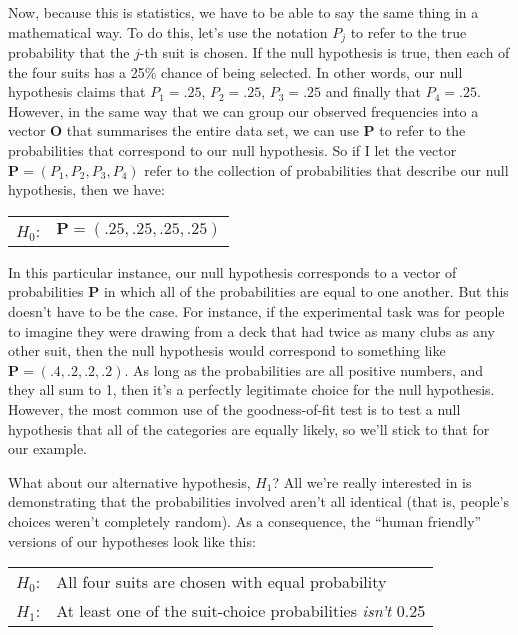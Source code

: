 \noindent
Now, because this is statistics, we have to be able to say the same thing in a mathematical way. To do this, let's use the notation $P_j$ to refer to the true probability that the $j$-th suit is chosen. If the null hypothesis is true, then each of the four suits has a 25\% chance of being selected. In other words, our null hypothesis claims that $P_1 = .25$, $P_2 = .25$, $P_3 = .25$ and finally that $P_4 = .25$. However, in the same way that we can group our observed frequencies into a vector $\bm{O}$ that summarises the entire data set, we can use $\bm{P}$ to refer to the probabilities that correspond to our null hypothesis. So if I let the vector $\bm{P} = (P_1, P_2, P_3, P_4)$ refer to the collection of probabilities that describe our null hypothesis, then we have:

\smallskip
\begin{tabular}{ll}
$H_0$:\hspace*{0.5cm}  &  $\bm{P} = (.25, .25, .25, .25) $
\end{tabular} 
\smallskip

\noindent
In this particular instance, our null hypothesis corresponds to a vector of probabilities $\bm{P}$ in which all of the probabilities are equal to one another. But this doesn't have to be the case. For instance, if the experimental task was for people to imagine they were drawing from a deck that had twice as many clubs as any other suit, then the null hypothesis would correspond to something like $\bm{P} = (.4, .2, .2, .2)$. As long as the probabilities are all positive numbers, and they all sum to 1, then it's a perfectly legitimate choice for the null hypothesis. However, the most common use of the goodness-of-fit test is to test a null hypothesis that all of the categories are equally likely, so we'll stick to that for our example. 

What about our alternative hypothesis, $H_1$? All we're really interested in is demonstrating that the probabilities involved aren't all identical (that is, people's choices weren't completely random). As a consequence, the ``human friendly'' versions of our hypotheses look like this:

\smallskip
\begin{tabular}{ll}
$H_0$: \hspace*{0.5cm} & All four suits are chosen with equal probability \\
$H_1$: \hspace*{0.5cm} & At least one of the suit-choice probabilities {\it isn't} 0.25
\end{tabular} 
\smallskip

